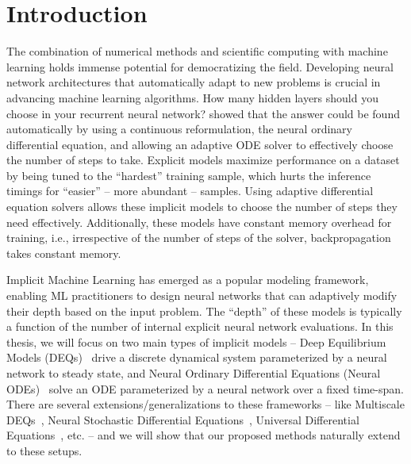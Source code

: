 \chapter{Introduction}
\label{chapter:introduction}

The combination of numerical methods and scientific computing with machine learning holds immense potential for democratizing the field. Developing neural network architectures that automatically adapt to new problems is crucial in advancing machine learning algorithms. How many hidden layers should you choose in your recurrent neural network? \citet{chen2018neural} showed that the answer could be found automatically by using a continuous reformulation, the neural ordinary differential equation, and allowing an adaptive ODE solver to effectively choose the number of steps to take. Explicit models maximize performance on a dataset by being tuned to the ``hardest'' training sample, which hurts the inference timings for ``easier'' -- more abundant -- samples. Using adaptive differential equation solvers allows these implicit models to choose the number of steps they need effectively. Additionally, these models have constant memory overhead for training, i.e., irrespective of the number of steps of the solver, backpropagation takes constant memory.

Implicit Machine Learning has emerged as a popular modeling framework, enabling ML practitioners to design neural networks that can adaptively modify their depth based on the input problem. The ``depth'' of these models is typically a function of the number of internal explicit neural network evaluations. In this thesis, we will focus on two main types of implicit models -- Deep Equilibrium Models (DEQs)~\citep{bai_deep_2019} drive a discrete dynamical system parameterized by a neural network to steady state, and Neural Ordinary Differential Equations (Neural ODEs)~\citep{chen2018neural} solve an ODE parameterized by a neural network over a fixed time-span. There are several extensions/generalizations to these frameworks -- like Multiscale DEQs~\citep{bai_multiscale_2020}, Neural Stochastic Differential Equations~\citep{liu2019neural}, Universal Differential Equations~\citep{rackauckas2020universal}, etc. -- and we will show that our proposed methods naturally extend to these setups.

